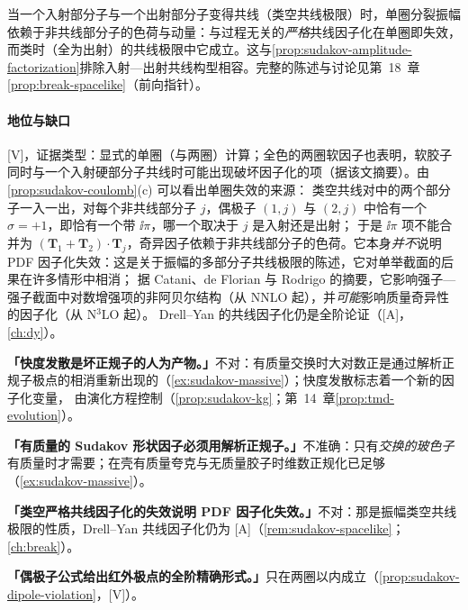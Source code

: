 \begin{remark}\label{rem:sudakov-spacelike}
当一个入射部分子与一个出射部分子变得共线（类空共线极限）时，单圈分裂振幅依赖于非共线部分子的色荷与动量：与过程无关的\emph{严格}共线因子化在单圈即失效，
而类时（全为出射）的共线极限中它成立\cite{CataniDeFlorianRodrigo2012}。这与\cref{prop:sudakov-amplitude-factorization}排除入射—出射共线构型相容。完整的陈述与讨论见第~18~章\cref{prop:break-spacelike}（前向指针）。
\end{remark}

\paragraph{地位与缺口}[V]，证据类型：显式的单圈（与两圈）计算\cite{CataniDeFlorianRodrigo2012}；全色的两圈软因子\cite{Dixon:2019lnw}也表明，软胶子同时与一个入射硬部分子共线时可能出现破坏因子化的项（据该文摘要）。由\cref{prop:sudakov-coulomb}(c) 可以看出单圈失效的来源：
类空共线对中的两个部分子一入一出，对每个非共线部分子 $j$，偶极子 $(1,j)$ 与 $(2,j)$ 中恰有一个 $\sigma=+1$，即恰有一个带 $\ii\pi$，哪一个取决于 $j$ 是入射还是出射；
于是 $\ii\pi$ 项不能合并为 $(\mathbf T_1+\mathbf T_2)\cdot\mathbf T_j$，奇异因子依赖于非共线部分子的色荷。它本身\emph{并不}说明 PDF 因子化失效：这是关于振幅的多部分子共线极限的陈述，它对单举截面的后果在许多情形中相消；
据 Catani、de Florian 与 Rodrigo 的摘要，它影响强子—强子截面中对数增强项的非阿贝尔结构（从 NNLO 起），并\emph{可能}影响质量奇异性的因子化（从 N$^3$LO 起）。
Drell--Yan 的共线因子化仍是全阶论证（[A]，\cref{ch:dy}）。

\begin{tcolorbox}[enhanced,breakable,title=常见误解,fonttitle=\bfseries,
  colback=gray!3!white,colframe=gray!55!black,boxrule=0.6pt,arc=2pt,
  left=5pt,right=5pt,top=3pt,bottom=3pt,before skip=6pt,after skip=6pt]
\textbf{「快度发散是坏正规子的人为产物。」}不对：有质量交换时大对数正是通过解析正规子极点的相消重新出现的（\cref{ex:sudakov-massive}）；快度发散标志着一个新的因子化变量，
由演化方程控制（\cref{prop:sudakov-kg}；第~14~章\cref{prop:tmd-evolution}）。\par
\textbf{「有质量的 Sudakov 形状因子必须用解析正规子。」}不准确：只有\emph{交换的玻色子}有质量时才需要；在壳有质量夸克与无质量胶子时维数正规化已足够（\cref{ex:sudakov-massive}）。\par
\textbf{「类空严格共线因子化的失效说明 PDF 因子化失效。」}不对：那是振幅类空共线极限的性质，Drell--Yan 共线因子化仍为 [A]（\cref{rem:sudakov-spacelike}；\cref{ch:break}）。\par
\textbf{「偶极子公式给出红外极点的全阶精确形式。」}只在两圈以内成立（\cref{prop:sudakov-dipole-violation}，[V]）。
\end{tcolorbox}

